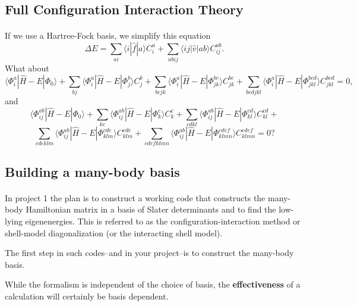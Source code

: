 \documentclass[%
twoside,                 %
final,                   %
10pt]{article}
\begin{document}
\subsection*{Full Configuration Interaction Theory}

\paragraph{}
If we use a Hartree-Fock basis, we simplify this equation
\[
\Delta E=\sum_{ai}\langle i| \hat{f}|a \rangle C_{i}^{a}+
\sum_{abij}\langle ij | \hat{v}| ab \rangle C_{ij}^{ab}.
\]
What about
\[
\langle \Phi_i^a | \hat{H} -E| \Phi_0\rangle + \sum_{bj}\langle \Phi_i^a | \hat{H} -E|\Phi_{j}^{b} \rangle C_{j}^{b}+
\sum_{bcjk}\langle \Phi_i^a | \hat{H} -E|\Phi_{jk}^{bc} \rangle C_{jk}^{bc}+
\sum_{bcdjkl}\langle \Phi_i^a | \hat{H} -E|\Phi_{jkl}^{bcd} \rangle C_{jkl}^{bcd}=0,
\]
and
\[
\langle \Phi_{ij}^{ab} | \hat{H} -E| \Phi_0\rangle + \sum_{kc}\langle \Phi_{ij}^{ab} | \hat{H} -E|\Phi_{k}^{c} \rangle C_{k}^{c}+
\sum_{cdkl}\langle \Phi_{ij}^{ab} | \hat{H} -E|\Phi_{kl}^{cd} \rangle C_{kl}^{cd}+
\]
\[
\sum_{cdeklm}\langle \Phi_{ij}^{ab} | \hat{H} -E|\Phi_{klm}^{cde} \rangle C_{klm}^{cde}+\sum_{cdefklmn}\langle \Phi_{ij}^{ab} | \hat{H} -E|\Phi_{klmn}^{cdef} \rangle C_{klmn}^{cdef}=0?
\]







\subsection*{Building a many-body basis}

\paragraph{}

In project 1 the plan  is to construct a working code that constructs the 
many-body Hamiltonian matrix in a basis of Slater determinants and to find the low-lying eigenenergies. 
This is referred to as the configuration-interaction method or shell-model diagonalization 
(or the interacting shell model). 

The first step in such codes--and in your project--is to construct the many-body basis.  

While the formalism is independent of the choice of basis, the \textbf{effectiveness} of a calculation 
will certainly be basis dependent. 
\end{document}
